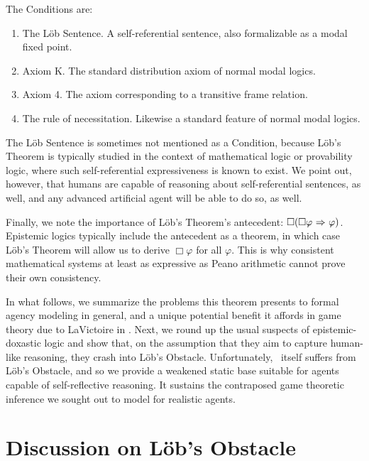 The Conditions are:
\begin{enumerate}
	\item The L\"ob Sentence. A self-referential sentence, also formalizable as a modal fixed point.
	\item Axiom K. The standard distribution axiom of normal modal logics.
	\item Axiom 4. The axiom corresponding to a transitive frame relation.
	\item The rule of necessitation. Likewise a standard feature of normal modal logics.
\end{enumerate} 

The L\"ob Sentence is sometimes not mentioned as a Condition, because L\"ob's Theorem is typically studied in the context of mathematical logic or provability logic, where such self-referential expressiveness is known to exist. We point out, however, that humans are capable of reasoning about self-referential sentences, as well, and any advanced artificial agent will be able to do so, as well. 

Finally, we note the importance of L\"ob's Theorem's antecedent: $\Box(\Box\varphi {\ \Rightarrow \ } \varphi)$. Epistemic logics typically include the antecedent as a theorem, in which case L\"ob's Theorem will allow us to derive $\Box\varphi$ for all $\varphi$. This is why consistent mathematical systems at least as expressive as Peano arithmetic cannot prove their own consistency. 

In what follows, we summarize the problems this theorem presents to formal agency modeling in general, and a unique potential benefit it affords in game theory due to LaVictoire \etal in \cite{MIRIPD}. Next, we round up the usual suspects of epistemic-doxastic logic and show that, on the assumption that they aim to capture human-like reasoning, they crash into L\"ob's Obstacle. Unfortunately, \DASL\ itself suffers from L\"ob's Obstacle, and so we provide a weakened static base suitable for agents capable of self-reflective reasoning. It sustains the contraposed game theoretic inference we sought out to model for realistic agents.

\section{Discussion on L\"ob's Obstacle}
\label{sec:lob_discussion}

